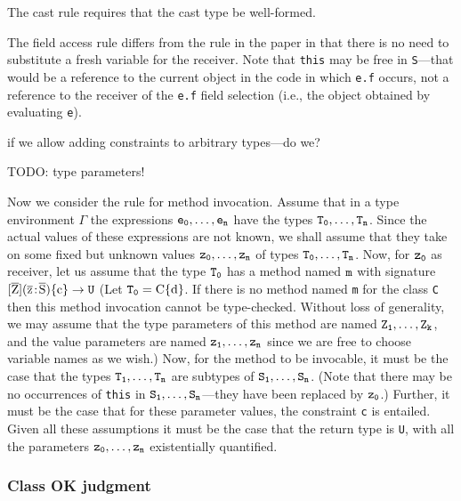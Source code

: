 \documentclass[preprint,nocopyrightspace,9pt]{sigplanconf}
\begin{document}
The cast rule
requires that the cast type be well-formed. 

The field access rule 
differs from the rule in the paper in that there is no need to
substitute a fresh variable for the receiver. Note that {\tt this} may be free
in {\tt S}---that would be a reference to the current object in the code in
which {\tt e.f} occurs, not a reference to the receiver of the {\tt e.f} field
selection (i.e., the object obtained by evaluating {\tt e}).

\noindent
if we allow adding constraints to arbitrary types---do we?

TODO: type parameters!

Now we consider the rule for method invocation. Assume that in a type
environment $\Gamma$ the expressions ${\tt e_0}, \dots, {\tt e_n}$
have the types ${\tt T_0}, \dots, {\tt T_n}$.
Since the
actual values of these expressions are not known, we shall assume that
they take on some fixed but unknown values
                                     ${\tt z_0}, \dots, {\tt z_n}$
of types ${\tt T_0}, \dots, {\tt T_n}$.
Now, for ${\tt z_0}$ as receiver, let us assume that the type
${\tt T_0}$ has a method named ${\tt m}$
with signature
$[\xbar{Z}](\xbar{z} \ty \xbar{S})\Xcd{\{c\}} \to {\tt U}$
(Let ${\tt T_0} = \Xcd{C\{d\}}$.
 If there is no
method named {\tt m} for the class {\tt C} then this method invocation cannot be
type-checked. Without loss of generality, we may assume that the
type parameters of this method are named
                                     ${\tt Z_1}, \dots, {\tt Z_k}$, and
the value parameters are named
                                     ${\tt z_1}, \dots, {\tt z_n}$
since we are free to choose
variable names as we wish.)
Now, for the method to be invocable,
it must be the case that the types
    ${\tt T_1}, \dots, {\tt T_n}$
are subtypes of
    ${\tt S_1}, \dots, {\tt S_n}$.
(Note
that there may be no occurrences of {\tt this} in
    ${\tt S_1}, \dots, {\tt S_n}$---they have been
replaced by ${\tt z_0}$.)
Further, it must be the case that for these parameter
values, the constraint {\tt c} is entailed. Given all these assumptions it
must be the case that the return type is {\tt U}, with all the parameters
    ${\tt z_0}, \dots, {\tt z_n}$
existentially quantified.


\subsubsection{
        Class OK judgment
}
\end{document}
